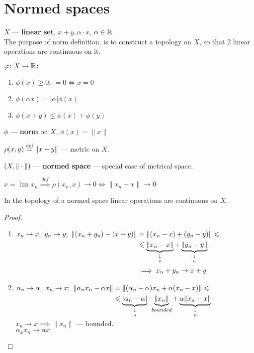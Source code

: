 \section{Normed spaces}
\begin{defn}
  $X$ --- \textbf{linear set}, $x + y, \alpha \cdot x$, $\alpha \in \mathbb{R}$ \\
  The purpose of norm definition, is to construct a topology on $X$, so that 2 linear operations are continuous on it.
\end{defn}
$\varphi\colon X \to \mathbb{R}\colon$
\begin{enumerate}
\item $\phi(x) \geq 0,\ = 0 \iff x = 0$
\item $\phi(\alpha x) = |\alpha| \phi(x)$
\item $\phi(x + y) \leq \phi(x) + \phi(y)$
\end{enumerate}
\begin{defn}
  $\phi$ --- \textbf{norm} on $X$, $\phi(x) = \|x\|$
\end{defn}
$\rho(x, y) \overset{\text{def}}{=} \|x - y\|$ --- metric on $X$.
\begin{defn}
  $\\(X, \|\cdot\|)$ --- \textbf{normed space} --- special case of metrical space.
\end{defn}
\noindent
$x = \lim x_n \overset{def}{\implies} \rho(x_n, x) \to 0 \iff \|x_n - x\| \to 0$
\begin{stm}
  In the topology of a normed space linear operations are continuous on $X$.
\end{stm}
\begin{proof}\leavevmode
  \begin{enumerate}
  \item
    $\begin{aligned}[t]
      x_n \to x,\ y_n \to y;\ \|(x_n + y_n) - (x + y)\| & = \|(x_n - x) + (y_n - y)\|  \leqslant \\
      & \leqslant  \underbrace{\|x_n - x\|}_{\underset{0}{\downarrow}} + \underbrace{\|y_n - y\|}_{\underset{0}{\downarrow}} \\
      & \implies x_n + y_n \to x + y
    \end{aligned}$
  \item
    $\begin{aligned}[t]
       \alpha_n \to \alpha,\ x_n \to x;\ \|\alpha_n x_n - \alpha x\| & =
        \|(\alpha_n - \alpha)x_n + \alpha(x_n - x)\| \leqslant \\
        & \leqslant \underbrace{|\alpha_n - \alpha|}_{\underset{0}{\downarrow}} \cdot \underbrace{\|x_n\|}_{bounded} + \underbrace{\alpha\|x_n - x\|}_{\underset{0}{\downarrow}}
    \end{aligned}$ \\
    $x_n \to x \implies \|x_n\|$ --- bounded. \\
    $\alpha_x x_n \to \alpha x$ \qedhere
  \end{enumerate}
\end{proof}
